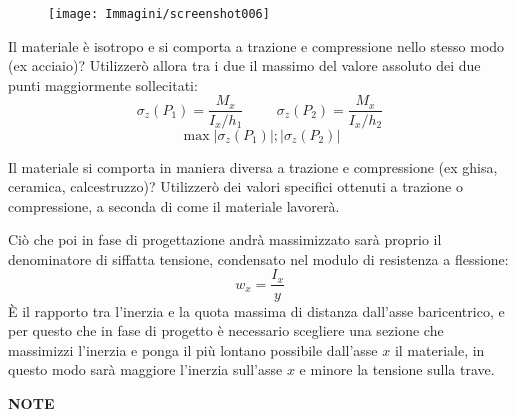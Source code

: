 \documentclass{article}
\begin{document}
\begin{adjustwidth}{2in}{}
\begin{figure}[H]
	\centering
	\texttt{[image: Immagini/screenshot006]}
	\label{fig:screenshot006}
\end{figure}
		
		Il materiale è isotropo e si comporta a trazione e compressione nello stesso modo (ex acciaio)? Utilizzerò allora tra i due il massimo del valore assoluto dei due punti maggiormente sollecitati:
		\[ \sigma_z(P_1) = \dfrac{M_x}{I_x/h_1} \hspace{1cm} \sigma_z(P_2) = \dfrac{M_x}{I_x/h_2}\]
		\[ \max{|\sigma_z(P_1)|; |\sigma_z(P_2)|}\]
		
		Il materiale si comporta in maniera diversa a trazione e compressione (ex ghisa, ceramica, calcestruzzo)? Utilizzerò dei valori specifici ottenuti a trazione o compressione, a seconda di come il materiale lavorerà. \newline 
		
		Ciò che poi in fase di progettazione andrà massimizzato sarà proprio il denominatore di siffatta tensione, condensato nel modulo di resistenza a flessione:
		\[w_x = \dfrac{I_x}{y}\]
		È il rapporto tra l'inerzia e la quota massima di distanza dall'asse baricentrico, e per questo che in fase di progetto è necessario scegliere una sezione che massimizzi l'inerzia e ponga il più lontano possibile dall'asse $x$ il materiale, in questo modo sarà maggiore l'inerzia sull'asse $ x $ e minore la tensione sulla trave.
		
	\newpage
	{\Large \textbf{NOTE}}

%		
\end{adjustwidth}
\end{document}
